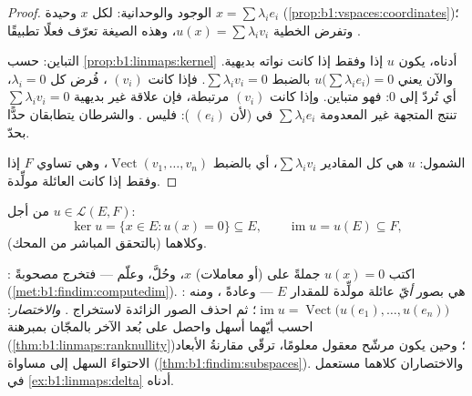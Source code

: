 \begin{proof}
الوجود والوحدانية: لكل $x$  وحيدة $x = \sum
\lambda_i e_i$ (\cref{prop:b1:vspaces:coordinates})؛ وتفرض الخطية
$u(x) = \sum \lambda_i v_i$، وهذه الصيغة تعرّف فعلًا تطبيقًا
.

التباين: حسب \cref{prop:b1:linmaps:kernel} أدناه، يكون $u$
 إذا وفقط إذا كانت نواته بديهية. والآن يعني $u\bigl(\sum\lambda_i
e_i\bigr) = 0$ بالضبط $\sum\lambda_i v_i = 0$. فإذا كانت $(v_i)$
، فُرض كل $\lambda_i = 0$، أي تُردّ 
إلى $0$: فهو متباين. وإذا كانت $(v_i)$ مرتبطة، فإن علاقة غير بديهية
$\sum\lambda_i v_i = 0$ تنتج المتجهة غير المعدومة
$\sum\lambda_i e_i$ في  (لأن $(e_i)$ ): فليس
. والشرطان يتطابقان حدًّا بحدّ.

الشمول:  $u$ هي  كل المقادير $\sum\lambda_i
v_i$، أي بالضبط $\operatorname{Vect}(v_1, \dots, v_n)$، وهي
تساوي $F$ إذا وفقط إذا كانت العائلة مولِّدة.
\end{proof}

\begin{definition}\label{def:b1:linmaps:kerim}
من أجل $u \in \mathcal{L}(E, F)$:
\[
\ker u = \{x \in E : u(x) = 0\} \subseteq E,
\qquad
\operatorname{im} u = u(E) \subseteq F ,
\]
وكلاهما  (بالتحقق المباشر من
المحك).
\end{definition}

\begin{method}
\label{met:b1:linmaps:kerim}
\emph{}: اكتب $u(x) = 0$ جملةً على 
(أو معاملات) $x$، وحُلَّ، وعلّم --- فتخرج 
مصحوبةً 
(\cref{met:b1:findim:computedim}). \emph{}: هي 
بصور \emph{أيّ} عائلة مولِّدة للمقدار $E$ ---
وعادةً ، ومنه $\operatorname{im} u =
\operatorname{Vect}\bigl(u(e_1), \dots, u(e_n)\bigr)$؛ ثم
احذف الصور الزائدة لاستخراج . \emph{والاختصار}:
احسب أيّهما أسهل واحصل على بُعد الآخر
بالمجّان بمبرهنة 
(\cref{thm:b1:linmaps:ranknullity})؛ وحين يكون  مرشّح معقول
 معلومًا، ترقّي مقارنةُ الأبعاد الاحتواءَ السهل
إلى مساواة
(\cref{thm:b1:findim:subspaces}). والاختصاران كلاهما مستعمل في
\cref{ex:b1:linmaps:delta} أدناه.
\end{method}

